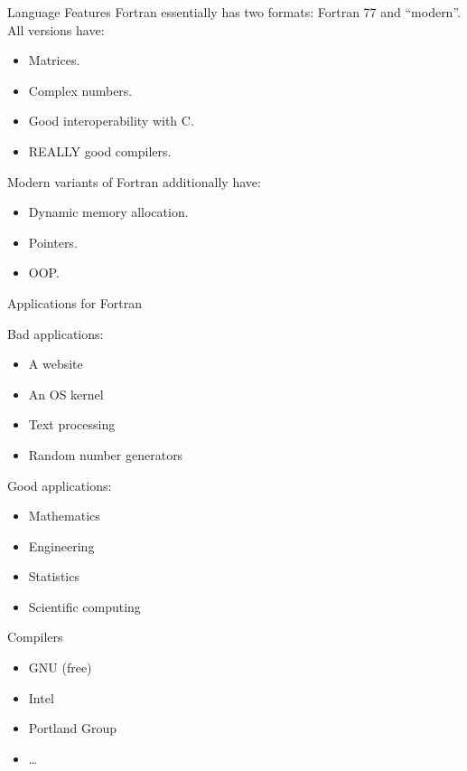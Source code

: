\begin{frame}
  \begin{block}{Language Features}\pause
  Fortran essentially has two formats:  Fortran 77 and ``modern''.\\
  All versions have:
  \begin{itemize}
    \item Matrices.
    \item Complex numbers.
    \item Good interoperability with C.
    \item REALLY good compilers.
  \end{itemize}
  Modern variants of Fortran additionally have:
  \begin{itemize}
    \item Dynamic memory allocation.
    \item Pointers.
    \item OOP.
  \end{itemize}
  \end{block}
\end{frame}

\begin{frame}
  \begin{block}{Applications for Fortran}\pause
  \begin{minipage}{.475\textwidth}
  Bad applications:
    \begin{itemize}
      \item A website
      \item An OS kernel
      \item Text processing
      \item Random number generators
    \end{itemize}
  \end{minipage}
  \begin{minipage}{.475\textwidth}
  Good applications:
    \begin{itemize}
      \item Mathematics
      \item Engineering
      \item Statistics
      \item Scientific computing
    \end{itemize}
  \end{minipage}
  \end{block}
\end{frame}

\begin{frame}
  \begin{block}{Compilers}\pause
  \begin{itemize}
    \item GNU  (free)
    \item Intel 
    \item Portland Group 
    \item \dots
  \end{itemize}
  \end{block}
\end{frame}



